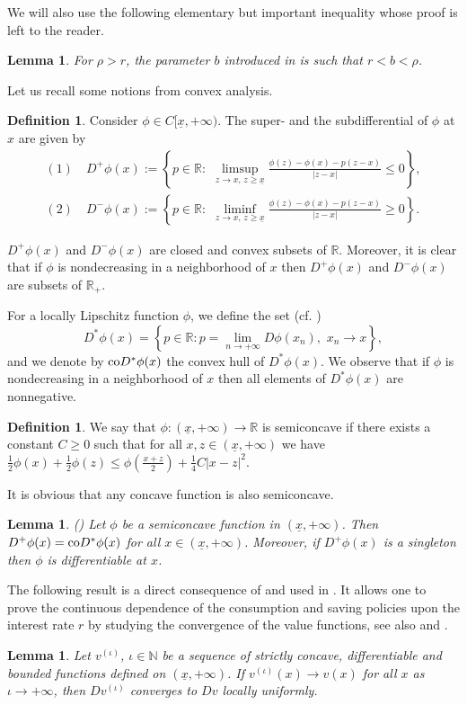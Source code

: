 \documentclass[11pt]{article}
\numberwithin{equation}{section}
\newtheorem{lemma}[thm]{Lemma}
\theoremstyle{definition}
\newtheorem{defn}[thm]{Definition}
\newcommand{\R}{\mathbb{R}}
\def\i{{(\iota)}}
\newcommand{\ux}{{\underline x}}
\newcommand{\beq}{\begin{equation}}
\newcommand{\eeq}{\end{equation}}
\newcommand{\lc}{\left(}
\newcommand{\rc}{\right)}
\theoremstyle{plain}
\begin{document}
We will also use the following elementary but important inequality whose proof  is left to the reader.
\begin{lemma}\label{Lemma: b}
For $\rho>r$, the parameter $b$ introduced in  is such that $r<b<\rho$. 
\end{lemma}
Let us recall some notions from convex analysis. 
\begin{defn}
Consider $\phi\in C[\ux,+\infty)$. The super- and the subdifferential of $\phi$ at $x$ are given by
\beq\label{Eq: Sub Sup Diff}
\begin{aligned}
(1)\quad D^+\phi(x):=\left\{p\in \R:\,\,\limsup_{z\to x,\,z\geq \ux}\frac{\phi(z)-\phi(x)-p(z-x)}{\vert z-x\vert} \leq 0\right\},\\
(2)\quad D^-\phi(x):=\left\{p\in \R:\,\,\liminf_{z\to x,\,z\geq \ux}\frac{\phi(z)-\phi(x)-p(z-x)}{\vert z-x\vert} \geq 0\right\}.
\end{aligned}
\eeq
\end{defn}
$D^+\phi(x)$ and $D^-\phi(x)$ are closed and convex subsets of $\R$. Moreover, it is clear that if $\phi$ is nondecreasing in a neighborhood of $x$ then $D^+\phi(x)$ and $D^-\phi(x)$ are subsets of $\mathbb{R}_+$. \par
For a locally Lipschitz function $\phi$, we define the set (cf. \cite[p. 63]{bardi1997optimal})
\beq
D^*\phi(x)=\left\{p\in \R: p=\lim_{n\to +\infty}D\phi(x_n),\,\,x_n\to x\right\},
\eeq
and we denote by ${\rm{co}}D^*\phi(x)$ the convex hull of $D^*\phi(x)$. We observe that if $\phi$ is nondecreasing in a neighborhood of $x$ then all elements of $D^*\phi(x)$ are nonnegative. 
\begin{defn}\label{def:semiconcave}
We say that $\phi: (\ux,+\infty)\to \mathbb{R}$ is semiconcave if there exists a constant $C\geq 0$ such that for all $x,z\in (\ux,+\infty)$ we have 
$
\frac{1}{2} \phi(x)+\frac{1}{2}\phi(z)\leq \phi \lc \frac{x+z}{2}\rc+\frac{1}{4}C\vert x-z\vert^2.
$
\end{defn}
It is obvious that any concave function is also semiconcave.
\begin{lemma}\label{lemma:semiconcave}
(\cite[Proposition 4.7]{bardi1997optimal}) Let $\phi$ be a semiconcave function in $(\ux,+\infty)$. Then $D^+\phi(x)={\rm{co}}D^*\phi(x)$ for all $x\in (\ux,+\infty)$. Moreover, if $D^+\phi(x)$ is a singleton then $\phi$ is differentiable at $x$. 
\end{lemma}
The following result is a direct consequence of \cite[Theorem 25.7]{tyrrell1970convex} and used in \cite{shigeta2023existence}. It allows one to prove the continuous dependence of the consumption and saving policies upon the interest rate $r$ by studying the convergence of the value functions, see also \cite{achdou2023mean} and \cite{camilli2025semi}.
\begin{lemma}\label{Lemma: Dv converge}
Let $v^{\i}$, $\iota \in \mathbb{N}$ be a sequence of strictly concave, differentiable and bounded functions defined on $(\ux,+\infty)$. If $v^{\i}(x)\to v(x)$ for all $x$ as $\iota \to +\infty$, then $Dv^{\i}$ converges to $Dv$ locally uniformly. 
\end{lemma}
\end{document}
